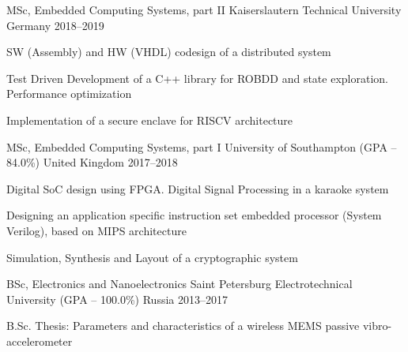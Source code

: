 

\begin{cventries}


  \cventry
  	{MSc, Embedded Computing Systems, part II}
  	{Kaiserslautern Technical University}
  	{Germany}%
  	{2018--2019}
    {
      \begin{cvitems} %
        \item {SW (Assembly) and HW (VHDL) codesign of a distributed system}
        \item {Test Driven Development of a C++ library for ROBDD and state exploration. Performance optimization}
        \item {Implementation of a secure enclave for RISCV architecture}
      \end{cvitems}
    }

  \cventry
    {MSc, Embedded Computing Systems, part I}
    {University of Southampton (GPA -- 84.0\%)}
    {United Kingdom}%
    {2017--2018}
    {
      \begin{cvitems} %
        \item {Digital SoC design using FPGA. Digital Signal Processing in a karaoke system}
        \item {Designing an application specific instruction set embedded processor (System Verilog), based on MIPS architecture}
        \item {Simulation, Synthesis and Layout of a cryptographic system}
      \end{cvitems}
    }

  \cventry
    {BSc, Electronics and Nanoelectronics}
    {Saint Petersburg Electrotechnical University (GPA -- 100.0\%)}
    {Russia}%
    {2013--2017}
    {
      \begin{cvitems} %
        \item {B.Sc. Thesis: Parameters and characteristics of a wireless MEMS passive vibro-accelerometer}
      \end{cvitems}
    }


\end{cventries}
